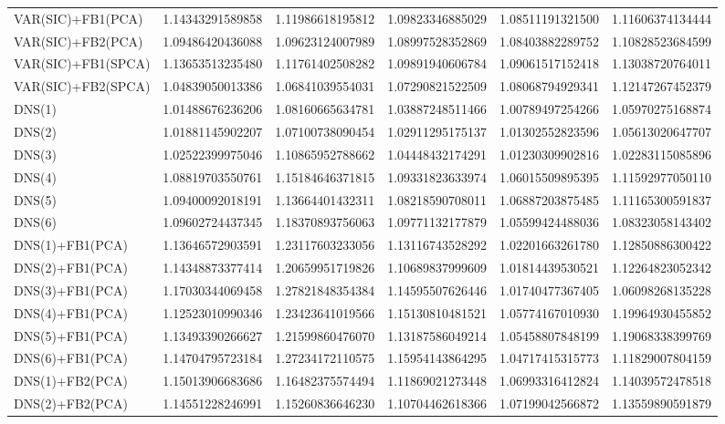\begin{table}[htb]
\begin{adjustbox}{totalheight=\baselineskip}
\begin{tabular}{lSSSSS}
VAR(SIC)+FB1(PCA) & 1.14343291589858 & 1.11986618195812 & 1.09823346885029 & 1.08511191321500 & 1.11606374134444 \\ 
VAR(SIC)+FB2(PCA) & 1.09486420436088 & 1.09623124007989 & 1.08997528352869 & 1.08403882289752 & 1.10828523684599 \\ 
VAR(SIC)+FB1(SPCA) & 1.13653513235480 & 1.11761402508282 & 1.09891940606784 & 1.09061517152418 & 1.13038720764011 \\ 
VAR(SIC)+FB2(SPCA) & 1.04839050013386 & 1.06841039554031 & 1.07290821522509 & 1.08068794929341 & 1.12147267452379 \\ 
DNS(1) & 1.01488676236206 & 1.08160665634781 & 1.03887248511466 & 1.00789497254266 & 1.05970275168874 \\ 
DNS(2) & 1.01881145902207 & 1.07100738090454 & 1.02911295175137 & 1.01302552823596 & 1.05613020647707 \\ 
DNS(3) & 1.02522399975046 & 1.10865952788662 & 1.04448432174291 & 1.01230309902816 & 1.02283115085896 \\ 
DNS(4) & 1.08819703550761 & 1.15184646371815 & 1.09331823633974 & 1.06015509895395 & 1.11592977050110 \\ 
DNS(5) & 1.09400092018191 & 1.13664401432311 & 1.08218590708011 & 1.06887203875485 & 1.11165300591837 \\ 
DNS(6) & 1.09602724437345 & 1.18370893756063 & 1.09771132177879 & 1.05599424488036 & 1.08323058143402 \\ 
DNS(1)+FB1(PCA) & 1.13646572903591 & 1.23117603233056 & 1.13116743528292 & 1.02201663261780 & 1.12850886300422 \\ 
DNS(2)+FB1(PCA) & 1.14348873377414 & 1.20659951719826 & 1.10689837999609 & 1.01814439530521 & 1.12264823052342 \\ 
DNS(3)+FB1(PCA) & 1.17030344069458 & 1.27821848354384 & 1.14595507626446 & 1.01740477367405 & 1.06098268135228 \\ 
DNS(4)+FB1(PCA) & 1.12523010990346 & 1.23423641019566 & 1.15130810481521 & 1.05774167010930 & 1.19964930455852 \\ 
DNS(5)+FB1(PCA) & 1.13493390266627 & 1.21599860476070 & 1.13187586049214 & 1.05458807848199 & 1.19068338399769 \\ 
DNS(6)+FB1(PCA) & 1.14704795723184 & 1.27234172110575 & 1.15954143864295 & 1.04717415315773 & 1.11829007804159 \\ 
DNS(1)+FB2(PCA) & 1.15013906683686 & 1.16482375574494 & 1.11869021273448 & 1.06993316412824 & 1.14039572478518 \\ 
DNS(2)+FB2(PCA) & 1.14551228246991 & 1.15260836646230 & 1.10704462618366 & 1.07199042566872 & 1.13559890591879 \\ 

\end{tabular}
\end{adjustbox}
\end{table}
